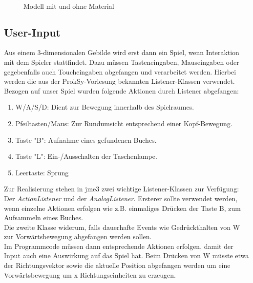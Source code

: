 \begin{figure}[h!]
	\myfloatalign
	 \quad
	 \\
	\caption[Materials auf Modellen]{Modell mit und ohne Material \cite{Fig1}}\label{fig:example}
	
\end{figure}







\subsection{User-Input}

Aus einem 3-dimensionalen Gebilde wird erst dann ein Spiel, wenn Interaktion mit dem Spieler stattfindet. Dazu müssen Tasteneingaben, Mauseingaben oder gegebenfalls auch Toucheingaben abgefangen und verarbeitet werden.
Hierbei werden die aus der ProkSy-Vorlesung bekannten Listener-Klassen verwendet.
Bezogen auf unser Spiel wurden folgende Aktionen durch Listener abgefangen:
\begin{enumerate}
	\item W/A/S/D: Dient zur Bewegung innerhalb des Spielraumes.
	\item Pfeiltasten/Maus: Zur Rundumsicht entsprechend einer Kopf-Bewegung.
	\item Taste "B": Aufnahme eines gefundenen Buches.
	\item Taste "L": Ein-/Ausschalten der Taschenlampe.
	\item Leertaste: Sprung
\end{enumerate} Zur Realisierung stehen in jme3 zwei wichtige Listener-Klassen zur Verfügung: Der \emph{ActionListener} und der \emph{AnalogListener}.
Ersterer sollte verwendet werden, wenn einzelne Aktionen erfolgen wie z.B. einmaliges Drücken der Taste B, zum Aufsammeln eines Buches.\\
Die zweite Klasse widerum, falls dauerhafte Events wie Gedrückthalten von W zur Vorwärtsbewegung abgefangen werden sollen. \\
Im Programmcode müssen dann entsprechende Aktionen erfolgen, damit der Input auch eine Auswirkung auf das Spiel hat. Beim Drücken von W müsste etwa der Richtungsvektor sowie die aktuelle Position abgefangen werden um eine Vorwärtsbewegung um x Richtungseinheiten zu erzeugen.


